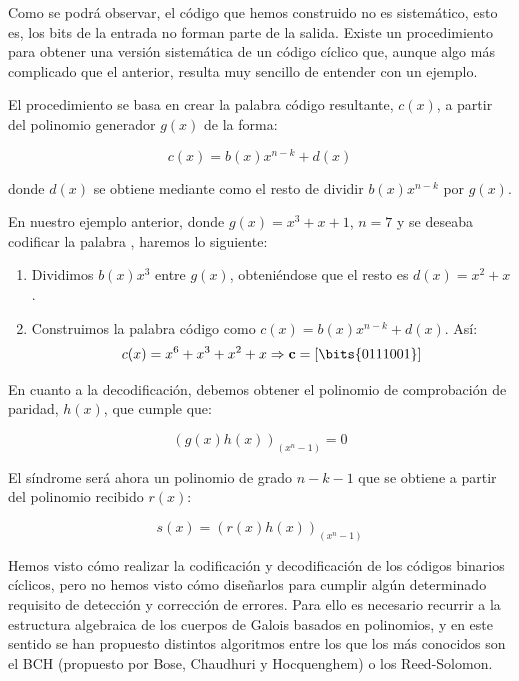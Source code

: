 \documentclass[es,apuntes]{uah}
\begin{document}
{Como se podrá observar, el código que hemos construido no es sistemático, esto es, los bits de la entrada no forman parte de la salida. Existe un procedimiento para obtener una versión sistemática de un código cíclico que, aunque algo más complicado que el anterior, resulta muy sencillo de entender con un ejemplo. 

El procedimiento se basa en crear la palabra código resultante, $c(x)$, a partir del polinomio generador $g(x)$ de la forma:

\begin{displaymath}
	c(x) = b(x) x^{n-k} + d(x)
\end{displaymath}

donde $d(x)$ se obtiene mediante como el resto de dividir $b(x) x^{n-k}$ por $g(x)$.

En nuestro ejemplo anterior, donde $g(x)=x^3+x+1$, $n=7$ y se deseaba codificar la palabra , haremos lo siguiente:

\begin{enumerate}
	\item Dividimos $b(x)x^3$ entre $g(x)$, obteniéndose que el resto es $d(x) = x^2+x$.
	\item Construimos la palabra código como $c(x) = b(x) x^{n-k} + d(x)$. Así:
	\begin{displaymath}
		c(x) = x^6+x^3+x^2+x \Rightarrow \mathbf{c} = [\bits{0111001}]
	\end{displaymath}
\end{enumerate} 



En cuanto a la decodificación, debemos obtener el polinomio de comprobación de paridad, $h(x)$, que cumple que:

\begin{displaymath}
	\left ( g(x) h(x) \right )_{(x^n-1)} = 0
\end{displaymath}

El síndrome será ahora un polinomio de grado $n-k-1$ que se obtiene a partir del polinomio recibido $r(x)$:

\begin{displaymath}
	s(x) = \left ( r(x) h(x) \right )_{(x^n - 1)}
\end{displaymath}

Hemos visto cómo realizar la codificación y decodificación de los códigos binarios cíclicos, pero no hemos visto cómo diseñarlos para cumplir algún determinado requisito de detección y corrección de errores. Para ello es necesario recurrir a la estructura algebraica de los cuerpos de Galois basados en polinomios, y en este sentido se han propuesto distintos algoritmos entre los que los más conocidos son el BCH (propuesto por Bose, Chaudhuri y Hocquenghem) o los Reed-Solomon. 

}
\end{document}
